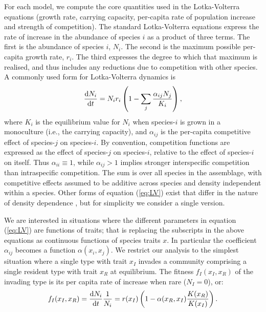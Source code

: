 \documentclass[a4paper,11pt]{article}
\begin{document}
For each model, we compute the core quantities used in the
Lotka-Volterra equations (growth rate, carrying capacity, per-capita
rate of population increase and strength of competition).  The
standard Lotka-Volterra equations express the rate of increase in the
abundance of species $i$ as a product of three terms.
%
The first is the abundance of species $i$, $N_i$.
%
The second is the maximum possible per-capita growth rate, $r_i$. The
third expresses the degree to which that maximum is realised, and
thus includes any reductions due to competition with other species. A
commonly used form for Lotka-Volterra dynamics is
%
\begin{equation}
\label{eq:LV}
\frac{\mathrm{d} N_i}{\mathrm{d} t} =
N_i r_i \left(1 - \sum_j \frac{\alpha_{ij} N_j}{K_i}\right),
\end{equation}
%
where $K_i$ is the equilibrium value for $N_i$ when species-$i$ is
grown in a monoculture (i.e., the carrying capacity), and
$\alpha_{ij}$ is the per-capita competitive effect of species-$j$ on
species-$i$.  By convention, competition functions are expressed as
the effect of species-$j$ on species-$i$, relative to the effect of
species-$i$ on itself. Thus $\alpha_{ii}\equiv 1$, while $\alpha_{ij}
>
1$ implies stronger interspecific competition than intraspecific
competition.
The sum is over all species in the assemblage, with
competitive effects assumed to be additive across species and density
independent within a species.
%
Other forms of equation (\ref{eq:LV}) exist that differ in the nature
of density dependence \citep[e.g.][]{Leimar-2013}, but for simplicity
we consider a single version.

We are interested in situations where the different parameters in
equation (\ref{eq:LV}) are functions of traits; that is replacing the
subscripts in the above equations as continuous functions of species
traits $x$.  In particular the coefficient $\alpha_{ij}$ becomes a
function $\alpha(x_i, x_j)$.
%
We restrict our analysis to the simplest situation where a single
type with trait $x_I$ invades a community comprising a single
resident type with trait $x_R$ at equilibrium.  The fitness $f_I(x_I,
x_R)$ of the invading type is its per capita rate of increase when
rare ($N_I = 0$), or:
%
\begin{equation}
  \label{eq:LVi}
   f_I(x_I, x_R) = \frac{\mathrm{d} N_i}{\mathrm{d} t} \frac{1}{N_i} =
    r(x_I)\left(1 - \alpha(x_R, x_I) \frac{K(x_R)}{K(x_I)}\right).
\end{equation}
%
\end{document}

